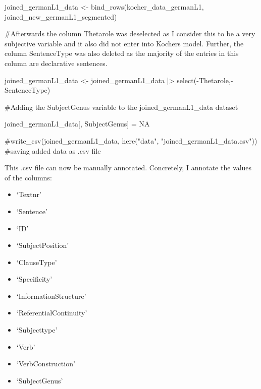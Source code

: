 \documentclass[
  letterpaper,
  DIV=11,
  numbers=noendperiod]{scrartcl}
\newenvironment{Shaded}{\begin{snugshade}}{\end{snugshade}}
\newcommand{\CommentTok}[1]{\textcolor[rgb]{0.37,0.37,0.37}{#1}}
\newcommand{\ConstantTok}[1]{\textcolor[rgb]{0.56,0.35,0.01}{#1}}
\newcommand{\FunctionTok}[1]{\textcolor[rgb]{0.28,0.35,0.67}{#1}}
\newcommand{\NormalTok}[1]{\textcolor[rgb]{0.00,0.23,0.31}{#1}}
\newcommand{\OtherTok}[1]{\textcolor[rgb]{0.00,0.23,0.31}{#1}}
\newcommand{\SpecialCharTok}[1]{\textcolor[rgb]{0.37,0.37,0.37}{#1}}
\newcommand{\StringTok}[1]{\textcolor[rgb]{0.13,0.47,0.30}{#1}}
\begin{document}
\begin{Shaded}
\begin{Highlighting}[]
\NormalTok{joined\_germanL1\_data }\OtherTok{\textless{}{-}} \FunctionTok{bind\_rows}\NormalTok{(kocher\_data\_germanL1, joined\_new\_germanL1\_segmented)}

\CommentTok{\#Afterwards the column \textquotesingle{}Thetarole\textquotesingle{} was deselected as I consider this to be a very subjective variable and it also did not enter into Kocher\textquotesingle{}s model. Further, the column \textquotesingle{}SentenceType\textquotesingle{} was also deleted as the majority of the entries in this column are declarative sentences. }

\NormalTok{joined\_germanL1\_data }\OtherTok{\textless{}{-}}\NormalTok{ joined\_germanL1\_data }\SpecialCharTok{|\textgreater{}} 
  \FunctionTok{select}\NormalTok{(}\SpecialCharTok{{-}}\NormalTok{Thetarole,}\SpecialCharTok{{-}}\NormalTok{SentenceType) }

\CommentTok{\#Adding the \textquotesingle{}SubjectGenus\textquotesingle{} variable to the \textquotesingle{}joined\_germanL1\_data\textquotesingle{} dataset}

\NormalTok{joined\_germanL1\_data[, }\StringTok{\textquotesingle{}SubjectGenus\textquotesingle{}}\NormalTok{] }\OtherTok{=} \ConstantTok{NA}

\CommentTok{\#write\_csv(joined\_germanL1\_data, here("data", "joined\_germanL1\_data.csv")) \#saving added data as .csv file}
\end{Highlighting}
\end{Shaded}

This .csv file can now be manually annotated. Concretely, I annotate the
values of the columns:

\begin{itemize}
\item
  `Textnr'
\item
  `Sentence'
\item
  `ID'
\item
  `SubjectPosition'
\item
  `ClauseType'
\item
  `Specificity'
\item
  `InformationStructure'
\item
  `ReferentialContinuity'
\item
  `Subjecttype'
\item
  `Verb'
\item
  `VerbConstruction'
\item
  `SubjectGenus'
\end{itemize}
\end{document}
